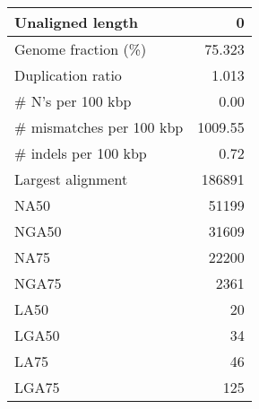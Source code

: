 \documentclass[12pt,a4paper]{article}
\begin{document}
\begin{table}[ht]
\begin{center}
\begin{tabular}{|l*{1}{|r}|}
Unaligned length & 0 \\ \hline
Genome fraction (\%) & 75.323 \\ \hline
Duplication ratio & 1.013 \\ \hline
\# N's per 100 kbp & 0.00 \\ \hline
\# mismatches per 100 kbp & 1009.55 \\ \hline
\# indels per 100 kbp & 0.72 \\ \hline
Largest alignment & 186891 \\ \hline
NA50 & 51199 \\ \hline
NGA50 & 31609 \\ \hline
NA75 & 22200 \\ \hline
NGA75 & 2361 \\ \hline
LA50 & 20 \\ \hline
LGA50 & 34 \\ \hline
LA75 & 46 \\ \hline
LGA75 & 125 \\ \hline
\end{tabular}
\end{center}
\end{table}
\end{document}
